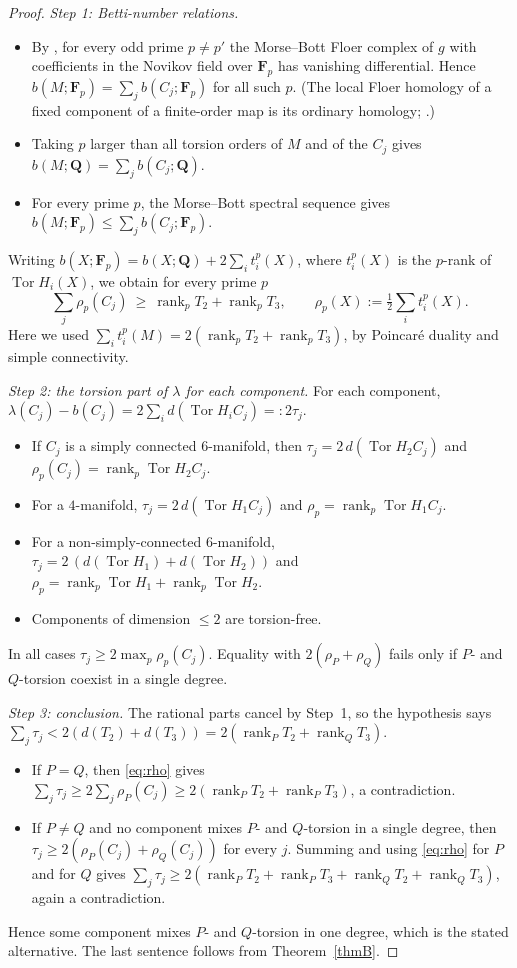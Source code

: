 \documentclass[11pt]{amsart}
\numberwithin{equation}{section}
\theoremstyle{definition}
\theoremstyle{remark}
\newcommand{\Q}{\mathbf Q}
\newcommand{\F}{\mathbf F}
\DeclareMathOperator{\Tor}{Tor}
\DeclareMathOperator{\rank}{rank}
\begin{document}
\begin{proof}
\emph{Step 1: Betti-number relations.}
\begin{itemize}
\item By \cite[Prop.~C.17(1)]{BSWX2026}, for every odd prime $p\ne p'$ the
  Morse--Bott Floer complex of $g$ with coefficients in the Novikov field
  over $\F_p$ has vanishing differential. Hence
  $b(M;\F_p)=\sum_j b(C_j;\F_p)$ for all such $p$. (The local Floer
  homology of a fixed component of a finite-order map is its ordinary
  homology; \cite[Prop.~C.9]{BSWX2026}.)
\item Taking $p$ larger than all torsion orders of $M$ and of the $C_j$
  gives $b(M;\Q)=\sum_j b(C_j;\Q)$.
\item For every prime $p$, the Morse--Bott spectral sequence gives
  $b(M;\F_p)\le\sum_jb(C_j;\F_p)$.
\end{itemize}
Writing $b(X;\F_p)=b(X;\Q)+2\sum_i t^p_i(X)$, where $t^p_i(X)$ is the
$p$-rank of $\Tor H_i(X)$, we obtain for every prime $p$
\begin{equation}\label{eq:rho}
 \sum_j\rho_p(C_j)\ \ge\ \rank_pT_2+\rank_pT_3,
 \qquad \rho_p(X):=\tfrac12\textstyle\sum_it^p_i(X).
\end{equation}
Here we used $\sum_it^p_i(M)=2(\rank_pT_2+\rank_pT_3)$, by Poincar\'e duality and
simple connectivity.

\emph{Step 2: the torsion part of $\lambda$ for each component.} For each
component, $\lambda(C_j)-b(C_j)=2\sum_i d(\Tor H_i C_j)=:2\tau_j$.
\begin{itemize}
\item If $C_j$ is a simply connected $6$-manifold, then
  $\tau_j=2\,d(\Tor H_2C_j)$ and $\rho_p(C_j)=\rank_p\Tor H_2C_j$.
\item For a $4$-manifold, $\tau_j=2\,d(\Tor H_1C_j)$ and
  $\rho_p=\rank_p\Tor H_1 C_j$.
\item For a non-simply-connected $6$-manifold, $\tau_j=2\,(d(\Tor H_1)+d(\Tor H_2))$ and
  $\rho_p=\rank_p\Tor H_1+\rank_p\Tor H_2$.
\item Components of dimension $\le2$ are torsion-free.
\end{itemize}
In all cases $\tau_j\ge2\max_p\rho_p(C_j)$. Equality with
$2(\rho_P+\rho_Q)$ fails only if $P$- and $Q$-torsion coexist in a single
degree.

\emph{Step 3: conclusion.} The rational parts cancel by Step~1, so the
hypothesis says $\sum_j\tau_j<2(d(T_2)+d(T_3))=2(\rank_PT_2+\rank_QT_3)$.
\begin{itemize}
\item If $P=Q$, then \eqref{eq:rho} gives
  $\sum_j\tau_j\ge2\sum_j\rho_P(C_j)\ge2(\rank_PT_2+\rank_PT_3)$, a
  contradiction.
\item If $P\ne Q$ and no component mixes $P$- and $Q$-torsion in a single
  degree, then $\tau_j\ge2(\rho_P(C_j)+\rho_Q(C_j))$ for every $j$.
  Summing and using \eqref{eq:rho} for $P$ and for $Q$ gives
  $\sum_j\tau_j\ge 2(\rank_PT_2+\rank_PT_3+\rank_QT_2+\rank_QT_3)$, again a
  contradiction.
\end{itemize}
Hence some component mixes $P$- and $Q$-torsion in one degree, which is
the stated alternative. The last sentence follows from Theorem~\ref{thmB}.
\end{proof}
\end{document}
